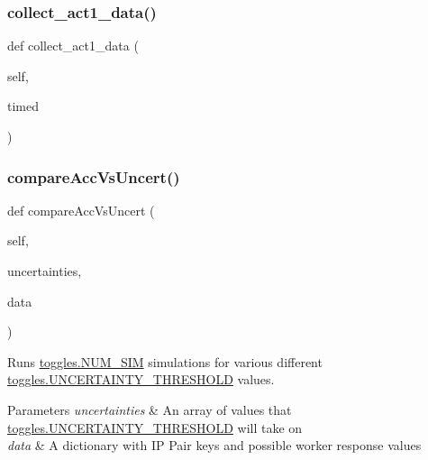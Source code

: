 \subsubsection{\texorpdfstring{collect\+\_\+act1\+\_\+data()}{collect\_act1\_data()}}
{\footnotesize\ttfamily def collect\+\_\+act1\+\_\+data (\begin{DoxyParamCaption}\item[{}]{self,  }\item[{}]{timed }\end{DoxyParamCaption})}

\mbox{\label{classdynamicfilterapp_1_1test__simulations_1_1_simulation_test_a1395b2cd07f422278160348baec14c9b}} 
\subsubsection{\texorpdfstring{compare\+Acc\+Vs\+Uncert()}{compareAccVsUncert()}}
{\footnotesize\ttfamily def compare\+Acc\+Vs\+Uncert (\begin{DoxyParamCaption}\item[{}]{self,  }\item[{}]{uncertainties,  }\item[{}]{data }\end{DoxyParamCaption})}



Runs \mbox{\hyperlink{namespacedynamicfilterapp_1_1toggles_a3baf5565851cd87736238d8dddfc1106}{toggles.\+N\+U\+M\+\_\+\+S\+IM}} simulations for various different \mbox{\hyperlink{namespacedynamicfilterapp_1_1toggles_aaefdc27b85545eb4a910f5c65f7d8bbb}{toggles.\+U\+N\+C\+E\+R\+T\+A\+I\+N\+T\+Y\+\_\+\+T\+H\+R\+E\+S\+H\+O\+LD}} values. 


\begin{DoxyParams}{Parameters}
{\em uncertainties} & An array of values that \mbox{\hyperlink{namespacedynamicfilterapp_1_1toggles_aaefdc27b85545eb4a910f5c65f7d8bbb}{toggles.\+U\+N\+C\+E\+R\+T\+A\+I\+N\+T\+Y\+\_\+\+T\+H\+R\+E\+S\+H\+O\+LD}} will take on \\
\hline
{\em data} & A dictionary with IP Pair keys and possible worker response values \\
\hline
\end{DoxyParams}
\mbox{\label{classdynamicfilterapp_1_1test__simulations_1_1_simulation_test_ace5df674cddd1b8f77748b585a69feb9}} 
